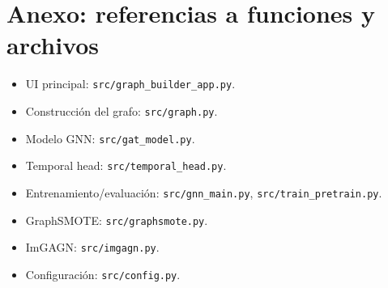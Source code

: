 \section{Anexo: referencias a funciones y archivos}
\begin{itemize}[leftmargin=*]
  \item UI principal: \texttt{src/graph\_builder\_app.py}.
  \item Construcci\'on del grafo: \texttt{src/graph.py}.
  \item Modelo GNN: \texttt{src/gat\_model.py}.
  \item Temporal head: \texttt{src/temporal\_head.py}.
  \item Entrenamiento/evaluaci\'on: \texttt{src/gnn\_main.py}, \texttt{src/train\_pretrain.py}.
  \item GraphSMOTE: \texttt{src/graphsmote.py}.
  \item ImGAGN: \texttt{src/imgagn.py}.
  \item Configuraci\'on: \texttt{src/config.py}.
\end{itemize}
